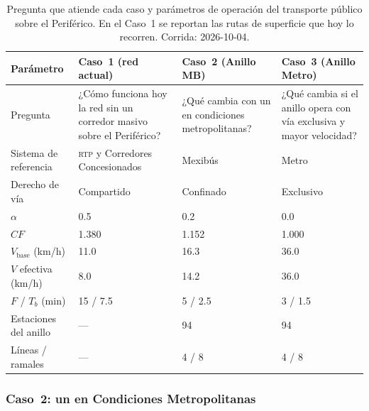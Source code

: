 \begin{table}[H]
    \centering
    \caption[Parámetros de los tres casos]{%
    Pregunta que atiende cada caso y parámetros de operación del transporte
    público sobre el Periférico. En el Caso~1 se reportan las rutas de
    superficie que hoy lo recorren. Corrida: 2026-10-04.}
    \label{tab:anillo-parametros}
    \small
    \begin{tabular}{|l|p{3.3cm}|p{3.3cm}|p{3.3cm}|}
        \hline
        \textbf{Parámetro} & \textbf{Caso~1 (red actual)} &
        \textbf{Caso~2 (Anillo MB)} & \textbf{Caso~3 (Anillo Metro)} \\
        \hline
        Pregunta & ¿Cómo funciona hoy la red sin un corredor masivo sobre el
            Periférico? & ¿Qué cambia con un \brt{} en condiciones
            metropolitanas? & ¿Qué cambia si el anillo opera con vía
            exclusiva y mayor velocidad? \\
        \hline
        Sistema de referencia     & \textsc{rtp} y Corredores Concesionados &
            Mexibús & Metro \\
        Derecho de vía            & Compartido & Confinado & Exclusivo \\
        $\alpha$                  & 0.5        & 0.2       & 0.0 \\
        $CF$                      & 1.380      & 1.152     & 1.000 \\
        $V_{\text{base}}$ (km/h)  & 11.0       & 16.3      & 36.0 \\
        $V$ efectiva (km/h)       & 8.0        & 14.2      & 36.0 \\
        $F$ / $T_b$ (min)         & 15 / 7.5   & 5 / 2.5   & 3 / 1.5 \\
        Estaciones del anillo     & ---        & 94        & 94 \\
        Líneas / ramales          & ---        & 4 / 8     & 4 / 8 \\
        \hline
    \end{tabular}
\end{table}

\subsubsection{Caso~2: un \texorpdfstring{\brt{}}{BRT} en Condiciones Metropolitanas}

